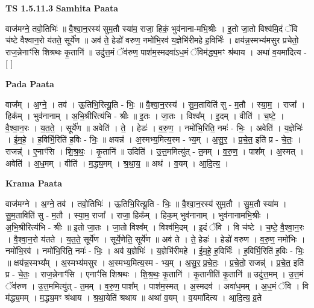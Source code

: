 \documentclass[17pt]{extarticle}
\begin{document}
\textbf{TS 1.5.11.3 } \newline
\textbf{Samhita Paata} \newline

वाज॑मग्ने॒ तवो॒तिभिः॑ ॥ वै॒श्वा॒न॒रस्य॑ सुम॒तौ स्या॑म॒ राजा॒ हिकं॒ भुव॑नाना-मभि॒श्रीः । इ॒तो जा॒तो विश्व॑मि॒दं ॅवि च॑ष्टे वैश्वान॒रो य॑तते॒ सूर्ये॑ण ॥ अव॑ ते॒ हेडो॑ वरुण॒ नमो॑भि॒रव॑ य॒ज्ञेभि॑रीमहे ह॒विर्भिः॑ । क्षय॑न्न॒स्मभ्य॑मसुर प्रचेतो॒ राज॒न्नेनाꣳ॑सि शिश्रथः कृ॒तानि॑ ॥ उदु॑त्त॒मं ॅव॑रुण॒ पाश॑म॒स्मदवा॑ऽध॒मं ॅविम॑द्ध्य॒मꣳ श्र॑थाय । अथा॑ व॒यमा॑दित्य - [ ] \newline

\textbf{Pada Paata} \newline

वाज᳚म् । अ॒ग्ने॒ । तव॑ । ऊ॒तिभि॒रित्यू॒ति - भिः॒ ॥ वै॒श्वा॒न॒रस्य॑ । सु॒म॒ताविति॑ सु - म॒तौ । स्या॒म॒ । राजा᳚ । हिक᳚म् । भुव॑नानाम् । अ॒भि॒श्रीरित्य॑भि - श्रीः ॥ इ॒तः । जा॒तः । विश्व᳚म् । इ॒दम् । वीति॑ । च॒ष्टे॒ । वै॒श्वा॒न॒रः । य॒त॒ते॒ । सूर्ये॑ण ॥ अवेति॑ । ते॒ । हेडः॑ । व॒रु॒ण॒ । नमो॑भि॒रिति॒ नमः॑ - भिः॒ । अवेति॑ । य॒ज्ञेभिः॑ । ई॒म॒हे॒ । ह॒विर्भि॒रिति॑ ह॒विः - भिः॒ ॥ क्षयन्न॑ । अ॒स्मभ्य॒मित्य॒स्म - भ्य॒म् । अ॒सु॒र॒ । प्र॒चे॒त॒ इति॑ प्र - चे॒तः॒ । राजन्न्॑ । ए॒नाꣳ॑सि । शि॒श्र॒थः॒ । कृ॒तानि॑ ॥ उदिति॑ । उ॒त्त॒ममित्यु॑त् - त॒मम् । व॒रु॒ण॒ । पाश᳚म् । अ॒स्मत् । अवेति॑ । अ॒ध॒मम् । वीति॑ । म॒द्ध्य॒मम् । श्र॒था॒य॒ ॥ अथ॑ । व॒यम् । आ॒दि॒त्य॒ ।  \newline


\textbf{Krama Paata} \newline

वाज॑मग्ने । अ॒ग्ने॒ तव॑ । तवो॒तिभिः॑ । ऊ॒तिभि॒रित्यू॒ति - भिः॒ ॥ वै॒श्वा॒न॒रस्य॑ सुम॒तौ । सु॒म॒तौ स्या॑म । सु॒म॒ताविति॑ सु - म॒तौ । स्या॒म॒ राजा᳚ । राजा॒ हिक᳚म् । हिक॒म् भुव॑नानाम् । भुव॑नानामभि॒श्रीः । अ॒भि॒श्रीरित्य॑भि - श्रीः ॥ इ॒तो जा॒तः । जा॒तो विश्व᳚म् । विश्व॑मि॒दम् । इ॒दं ॅवि । वि च॑ष्टे । च॒ष्टे॒ वै॒श्वा॒न॒रः । वै॒श्वा॒न॒रो य॑तते । य॒त॒ते॒ सूर्ये॑ण । सूर्ये॒णेति॒ सूर्ये॑ण ॥ अव॑ ते । ते॒ हेडः॑ । हेडो॑ वरुण । व॒रु॒ण॒ नमो॑भिः । नमो॑भि॒रव॑ । नमो॑भि॒रिति॒ नमः॑ - भिः॒ । अव॑ य॒ज्ञेभिः॑ । य॒ज्ञेभि॑रीमहे । ई॒म॒हे॒ ह॒विर्भिः॑ । ह॒विर्भि॒रिति॑ ह॒विः - भिः॒ ॥ क्षय॑न्न॒स्मभ्य᳚म् । अ॒स्मभ्य॑मसुर । अ॒स्मभ्य॒मित्य॒स्म - भ्य॒म् । अ॒सु॒र॒ प्र॒चे॒तः॒ । प्र॒चे॒तो॒ राजन्न्॑ । प्र॒चे॒त॒ इति॑ प्र - चे॒तः॒ । राज॒न्नेनाꣳ॑सि । एनाꣳ॑सि शिश्रथः । शि॒श्र॒थः॒ कृ॒तानि॑ । कृ॒तानीति॑ कृ॒तानि॑ ॥ उदु॑त्त॒मम् । उ॒त्त॒मं ॅव॑रुण । उ॒त्त॒ममित्यु॑त् - त॒मम् । व॒रु॒ण॒ पाश᳚म् । पाश॑म॒स्मत् । अ॒स्मदव॑ । अवा॑ध॒मम् । अ॒ध॒मं ॅवि । वि म॑द्ध्य॒मम् । म॒द्ध्य॒मꣳ श्र॑थाय । श्र॒था॒येति॑ श्रथाय ॥ अथा॑ व॒यम् । व॒यमा॑दित्य । आ॒दि॒त्य॒ व्र॒ते \newline
\end{document}

